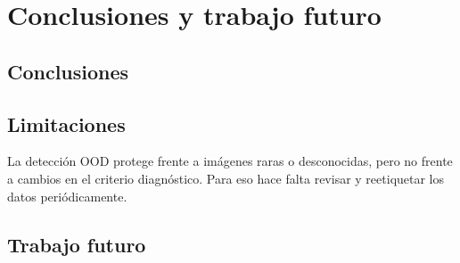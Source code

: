 %

\chapter{Conclusiones y trabajo futuro}\label{cap:conclusiones}

\section{Conclusiones}\label{sec:conclusiones}


\section{Limitaciones}\label{sec:limitaciones}

La detección OOD protege frente a imágenes raras o desconocidas, pero no frente a cambios en el criterio diagnóstico. Para eso hace falta revisar y reetiquetar los datos periódicamente.


\section{Trabajo futuro}\label{sec:trabajo-futuro}


\endinput
